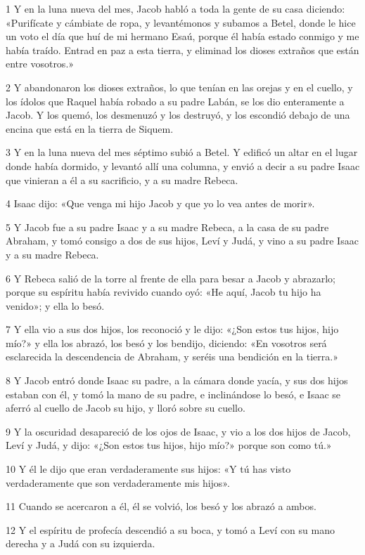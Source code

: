 \par 1 Y en la luna nueva del mes, Jacob habló a toda la gente de su casa diciendo: «Purifícate y cámbiate de ropa, y levantémonos y subamos a Betel, donde le hice un voto el día que huí de mi hermano Esaú, porque él había estado conmigo y me había traído. Entrad en paz a esta tierra, y eliminad los dioses extraños que están entre vosotros.»
\par 2 Y abandonaron los dioses extraños, lo que tenían en las orejas y en el cuello, y los ídolos que Raquel había robado a su padre Labán, se los dio enteramente a Jacob. Y los quemó, los desmenuzó y los destruyó, y los escondió debajo de una encina que está en la tierra de Siquem.
\par 3 Y en la luna nueva del mes séptimo subió a Betel. Y edificó un altar en el lugar donde había dormido, y levantó allí una columna, y envió a decir a su padre Isaac que vinieran a él a su sacrificio, y a su madre Rebeca.
\par 4 Isaac dijo: «Que venga mi hijo Jacob y que yo lo vea antes de morir».
\par 5 Y Jacob fue a su padre Isaac y a su madre Rebeca, a la casa de su padre Abraham, y tomó consigo a dos de sus hijos, Leví y Judá, y vino a su padre Isaac y a su madre Rebeca.
\par 6 Y Rebeca salió de la torre al frente de ella para besar a Jacob y abrazarlo; porque su espíritu había revivido cuando oyó: «He aquí, Jacob tu hijo ha venido»; y ella lo besó.
\par 7 Y ella vio a sus dos hijos, los reconoció y le dijo: «¿Son estos tus hijos, hijo mío?» y ella los abrazó, los besó y los bendijo, diciendo: «En vosotros será esclarecida la descendencia de Abraham, y seréis una bendición en la tierra.»
\par 8 Y Jacob entró donde Isaac su padre, a la cámara donde yacía, y sus dos hijos estaban con él, y tomó la mano de su padre, e inclinándose lo besó, e Isaac se aferró al cuello de Jacob su hijo, y lloró sobre su cuello.
\par 9 Y la oscuridad desapareció de los ojos de Isaac, y vio a los dos hijos de Jacob, Leví y Judá, y dijo: «¿Son estos tus hijos, hijo mío?» porque son como tú.»
\par 10 Y él le dijo que eran verdaderamente sus hijos: «Y tú has visto verdaderamente que son verdaderamente mis hijos».
\par 11 Cuando se acercaron a él, él se volvió, los besó y los abrazó a ambos.
\par 12 Y el espíritu de profecía descendió a su boca, y tomó a Leví con su mano derecha y a Judá con su izquierda.
